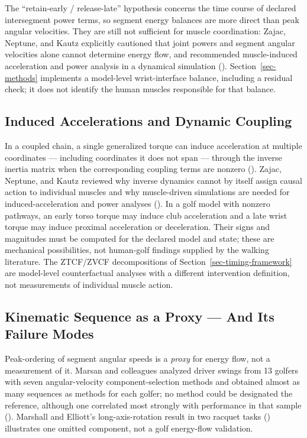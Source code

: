 \documentclass[
  letterpaper,
]{report}
\begin{document}
The ``retain-early / release-late'' hypothesis concerns the time course
of declared intersegment power terms, so segment energy balances are
more direct than peak angular velocities. They are still not sufficient
for muscle coordination: Zajac, Neptune, and Kautz explicitly cautioned
that joint powers and segment angular velocities alone cannot determine
energy flow, and recommended muscle-induced acceleration and power
analysis in a dynamical simulation (). Section~\ref{sec-methods} implements a
model-level wrist-interface balance, including a residual check; it does
not identify the human muscles responsible for that balance.

\subsection{Induced Accelerations and Dynamic
Coupling}\label{induced-accelerations-and-dynamic-coupling}

In a coupled chain, a single generalized torque can induce acceleration
at multiple coordinates --- including coordinates it does not span ---
through the inverse inertia matrix when the corresponding coupling terms
are nonzero (). Zajac,
Neptune, and Kautz reviewed why inverse dynamics cannot by itself assign
causal action to individual muscles and why muscle-driven simulations
are needed for induced-acceleration and power analyses
(). In a golf
model with nonzero pathways, an early torso torque may induce club
acceleration and a late wrist torque may induce proximal acceleration or
deceleration. Their signs and magnitudes must be computed for the
declared model and state; these are mechanical possibilities, not
human-golf findings supplied by the walking literature. The ZTCF/ZVCF
decompositions of Section~\ref{sec-timing-framework} are model-level
counterfactual analyses with a different intervention definition, not
measurements of individual muscle action.

\subsection{Kinematic Sequence as a Proxy --- And Its Failure
Modes}\label{kinematic-sequence-as-a-proxy-and-its-failure-modes}

Peak-ordering of segment angular speeds is a \emph{proxy} for energy
flow, not a measurement of it. Marsan and colleagues analyzed driver
swings from 13 golfers with seven angular-velocity component-selection
methods and obtained almost as many sequences as methods for each
golfer; no method could be designated the reference, although one
correlated most strongly with performance in that sample
(). Marshall and Elliott's
long-axis-rotation result in two racquet tasks
() illustrates one
omitted component, not a golf energy-flow validation.
\end{document}
